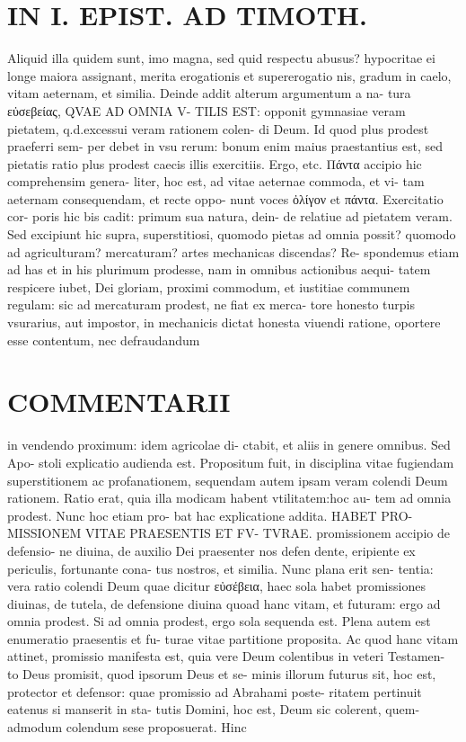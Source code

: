 \documentclass{article}
\begin{document}
\begin{pages}
\section*{IN I. EPIST. AD TIMOTH. }
\marginpar{[ p.99 ]}\pstart Aliquid illa quidem sunt, imo magna, sed quid respectu abusus? hypocritae ei longe maiora assignant, merita erogationis et supererogatio nis, gradum in caelo, vitam aeternam, et similia.  \pend\pstart Deinde addit alterum argumentum a na- tura εὐσεβείας, QVAE AD OMNIA V- TILIS EST: opponit gymnasiae veram pietatem, q.d.excessui veram rationem colen- di Deum. Id quod plus prodest praeferri sem- per debet in vsu rerum: bonum enim maius praestantius est, sed pietatis ratio plus prodest caecis illis exercitiis. Ergo, etc.  \pend\pstart Πάντα accipio hic comprehensim genera- liter, hoc est, ad vitae aeternae commoda, et vi- tam aeternam consequendam, et recte oppo- nunt voces ὀλίγον et πάντα. Exercitatio cor- poris hic bis cadit: primum sua natura, dein- de relatiue ad pietatem veram. Sed excipiunt hic supra, superstitiosi, quomodo pietas ad omnia possit? quomodo ad agriculturam? mercaturam? artes mechanicas discendas? Re- spondemus etiam ad has et in his plurimum prodesse, nam in omnibus actionibus aequi- tatem respicere iubet, Dei gloriam, proximi commodum, et iustitiae communem regulam: sic ad mercaturam prodest, ne fiat ex merca- tore honesto turpis vsurarius, aut impostor, in mechanicis dictat honesta viuendi ratione, oportere esse contentum, nec defraudandum  \pend
\marginpar{[ p.100 ]}
\section*{COMMENTARII }\pstart in vendendo proximum: idem agricolae di- ctabit, et aliis in genere omnibus. Sed Apo- stoli explicatio audienda est. Propositum fuit, in disciplina vitae fugiendam superstitionem ac profanationem, sequendam autem ipsam veram colendi Deum rationem. Ratio erat, quia illa modicam habent vtilitatem:hoc au- tem ad omnia prodest. Nunc hoc etiam pro- bat hac explicatione addita. HABET PRO- MISSIONEM VITAE PRAESENTIS ET FV- TVRAE. promissionem accipio de defensio- ne diuina, de auxilio Dei praesenter nos defen dente, eripiente ex periculis, fortunante cona- tus nostros, et similia. Nunc plana erit sen- tentia: vera ratio colendi Deum quae dicitur εὐσέβεια, haec sola habet promissiones diuinas, de tutela, de defensione diuina quoad hanc vitam, et futuram: ergo ad omnia prodest. Si ad omnia prodest, ergo sola sequenda est. Plena autem est enumeratio praesentis et fu- turae vitae partitione proposita. Ac quod hanc vitam attinet, promissio manifesta est, quia vere Deum colentibus in veteri Testamen- to Deus promisit, quod ipsorum Deus et se- minis illorum futurus sit, hoc est, protector et defensor: quae promissio ad Abrahami poste- ritatem pertinuit eatenus si manserit in sta- tutis Domini, hoc est, Deum sic colerent, quem- admodum colendum sese proposuerat. Hinc  \pend

\end{pages}
\end{document}
